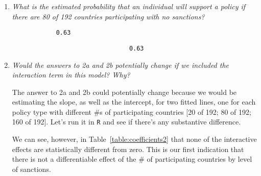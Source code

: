 \documentclass[12pt,letterpaper]{article}
\begin{document}
\begin{enumerate}
\begin{enumerate}
		
		\item
		\textit{What is the estimated probability that an individual will support a policy if there are 80 of 192 countries participating with no sanctions? }
		
			 
			
			\begin{verbatim}
			0.63 
			\end{verbatim}
			
						 
						
						\begin{verbatim}
								0.63 
						\end{verbatim}
		
		\item
		\textit{Would the answers to 2a and 2b potentially change if we included the interaction term in this model? Why? }
		
		The answer to 2a and 2b could potentially change because we would be estimating the slope, as well as the intercept, for two fitted lines, one for each policy type with different \#s of participating countries [20 of 192; 80 of 192; 160 of 192]. Let’s run it in \texttt{R} and see if there’s any substantive difference.
		
					 
		
		We can see, however, in Table~\ref{table:coefficients2} that none of the interactive effects are statistically different from zero. This is our first indication that there is not a differentiable effect of the \# of participating countries by level of sanctions.
		

\end{enumerate}
\end{enumerate}
\end{document}
